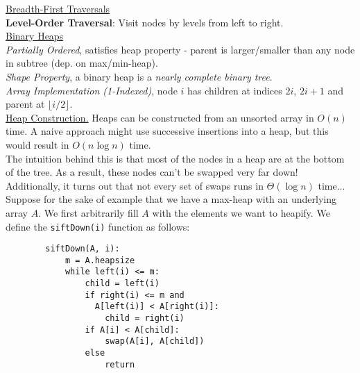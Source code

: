 \documentclass[12pt, fleqn]{general}
\begin{document}
\begin{multicols*}{2}
    \underline{Breadth-First Traversals}\\

    \textbf{Level-Order Traversal}: Visit nodes by levels from left to right.\\


    {\large \underline{Binary Heaps}}\\

    \emph{Partially Ordered}, satisfies heap property - parent is larger/smaller than any node in subtree (dep. on max/min-heap).\\
    
    \emph{Shape Property}, a binary heap is a \emph{nearly complete binary tree}.\\

    \emph{Array Implementation (1-Indexed)}, node $i$ has children at indices $2i$, $2i + 1$ and parent at $\lfloor i/2\rfloor$.\\

    \underline{Heap Construction.} Heaps can be constructed from an unsorted array in $O(n)$ time. A naive approach might use successive insertions into a heap, but this would result in $O(n \log n)$ time.\\
    
    The intuition behind this is that most of the nodes in a heap are at the bottom of the tree. As a result, these nodes can't be swapped very far down! Additionally, it turns out that not every set of swaps runs in $\Theta(\log n)$ time...\\
    
    Suppose for the sake of example that we have a max-heap with an underlying array $A$. We first arbitrarily fill $A$ with the elements we want to heapify. We define the \texttt{siftDown(i)} function as follows:

    \begin{framed}
    \begingroup
    \makeatletter
    \@totalleftmargin=-1.5cm
    \begin{verbatim}
        siftDown(A, i):
            m = A.heapsize
            while left(i) <= m:
                child = left(i)
                if right(i) <= m and 
                  A[left(i)] < A[right(i)]:
                    child = right(i)
                if A[i] < A[child]:
                    swap(A[i], A[child])
                else
                    return
    \end{verbatim}
    \makeatother
    \endgroup
    \end{framed}


\end{multicols*}
\end{document}
